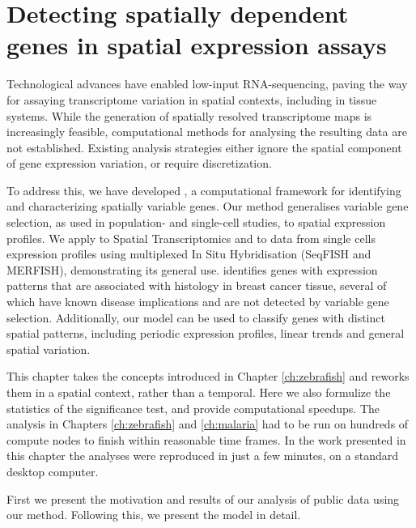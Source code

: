 
\chapter{Detecting spatially dependent genes in spatial expression assays} \label{ch:spatial}

\graphicspath{{Chapter5/Figs/}}

Technological advances have enabled low-input RNA-sequencing, paving the way for assaying transcriptome variation in spatial contexts, including in tissue systems. While the generation of spatially resolved transcriptome maps is increasingly feasible, computational methods for analysing the resulting data are not established. Existing analysis strategies either ignore the spatial component of gene expression variation, or require discretization.

To address this, we have developed , a computational framework for identifying and characterizing spatially variable genes. Our method generalises variable gene selection, as used in population- and single-cell studies, to spatial expression profiles. We apply  to Spatial Transcriptomics and to data from single cells expression profiles using multiplexed In Situ Hybridisation (SeqFISH and MERFISH), demonstrating its general use.  identifies genes with expression patterns that are associated with histology in breast cancer tissue, several of which have known disease implications and are not detected by variable gene selection. Additionally, our model can be used to classify genes with distinct spatial patterns, including periodic expression profiles, linear trends and general spatial variation.

This chapter takes the concepts introduced in Chapter \ref{ch:zebrafish} and reworks them in a spatial context, rather than a temporal. Here we also formulize the statistics of the significance test, and provide computational speedups. The analysis in Chapters \ref{ch:zebrafish} and \ref{ch:malaria} had to be run on hundreds of compute nodes to finish within reasonable time frames. In the work presented in this chapter the analyses were reproduced in just a few minutes, on a standard desktop computer.

First we present the motivation and results of our analysis of public data using our method. Following this, we present the model in detail.

